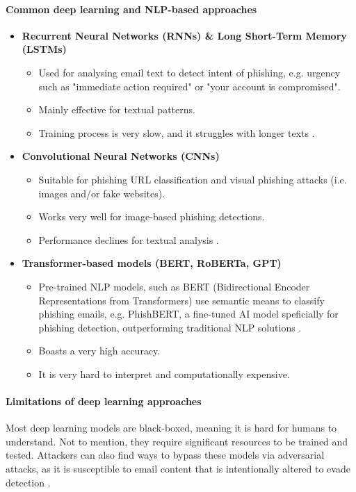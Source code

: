 \paragraph{Common deep learning and NLP-based approaches}
\begin{itemize}
    \item \textbf{Recurrent Neural Networks (RNNs) \& Long Short-Term Memory (LSTMs)}
    \begin{itemize}
        \item Used for analysing email text to detect intent of phishing, e.g. urgency such as "immediate action required" or "your account is compromised".
        \item Mainly effective for textual patterns.
        \item Training process is very slow, and it struggles with longer texts \citep{zhang2012phishing}.
    \end{itemize}
    \item \textbf{Convolutional Neural Networks (CNNs)}
    \begin{itemize}
        \item Suitable for phishing URL classification and visual phishing attacks (i.e. images and/or fake websites).
        \item Works very well for image-based phishing detections.
        \item Performance declines for textual analysis \citep{wang2019pdrcnn}.
    \end{itemize}
    \item \textbf{Transformer-based models (BERT, RoBERTa, GPT)}
    \begin{itemize}
      \item Pre-trained NLP models, such as BERT (Bidirectional Encoder Representations from Transformers) use semantic means to classify phishing emails, e.g. PhishBERT, a fine-tuned AI model speficially for phishing detection, outperforming traditional NLP solutions \citep{jamal2023improved}.
        \item Boasts a very high accuracy.
        \item It is very hard to interpret and computationally expensive.
    \end{itemize}
\end{itemize}

\paragraph{Limitations of deep learning approaches}
Most deep learning models are black-boxed, meaning it is hard for humans to understand. Not to mention, they require significant resources to be trained and tested. Attackers can also find ways to bypass these models via adversarial attacks, as it is susceptible to email content that is intentionally altered to evade detection \citep{carlini2017adversarial}.

